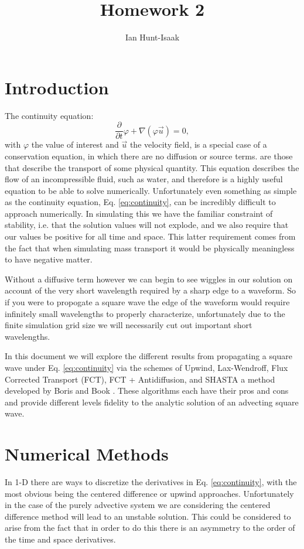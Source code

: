 \documentclass[]{article}
\title{Homework 2}
\author{Ian Hunt-Isaak}
\date{}
\begin{document}
\maketitle


\section{Introduction}
The continuity equation:
\begin{equation}
\frac{\partial}{\partial t} \varphi + \nabla(\varphi \vec{u}) = 0,
\label{eq:continuity}
\end{equation}
with $\varphi$ the value of interest and $\vec{u}$ the velocity field,  is a special case of a conservation equation, in which there are no diffusion or source terms. are those that describe the transport of some physical quantity. This equation describes the flow of an incompressible fluid, such as water, and therefore is a highly useful equation to be able to solve numerically. Unfortunately even something as simple as the continuity equation, Eq. \ref{eq:continuity}, can be incredibly difficult to approach numerically. In simulating this we have the familiar constraint of stability, i.e. that the solution values will not explode, and we also require that our values be positive for all time and space. This latter requirement comes from the fact that when simulating mass transport it would be physically meaningless to have negative matter. 

Without a diffusive term however we can begin to see wiggles in our solution on account of the very short wavelength required by a sharp edge to a waveform. So if you were to propogate a square wave the edge of the waveform would require infinitely small wavelengths to properly characterize, unfortunately due to the finite simulation grid size we will necessarily cut out important short wavelengths. 

In this document we will explore the different results from propagating a square wave under Eq. \ref{eq:continuity} via the schemes of Upwind, Lax-Wendroff, Flux Corrected Transport (FCT), FCT + Antidiffusion, and SHASTA a method developed by Boris and Book \cite{shasta}. These algorithms each have their pros and cons and provide different levels fidelity to the analytic solution of an advecting square wave.




\section{Numerical Methods}
In 1-D there are ways to discretize the derivatives in Eq. \ref{eq:continuity}, with the most obvious being the centered difference or upwind approaches. Unfortunately in the case of the purely advective system we are considering the centered difference method will lead to an unstable solution. This could be considered to arise from the fact that in order to do this there is an asymmetry to the order of the time and space derivatives. 
\end{document}
